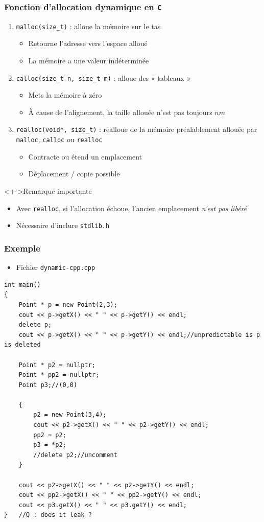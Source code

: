 \begin{frame}
\frametitle{Fonction d'allocation dynamique en \texttt{C}}
\begin{enumerate}[<+->]
\item \texttt{malloc(size\_t)} : alloue la mémoire sur le tas
	\begin{itemize}
	\item Retourne l'adresse vers l'espace alloué
	\item La mémoire a une valeur indéterminée
	\end{itemize}
\item \texttt{calloc(size\_t n, size\_t m)} : alloue des « tableaux »
	\begin{itemize}
	\item Mets la mémoire à zéro
	\item À cause de l'alignement, la taille allouée n'est pas toujours $nm$
	\end{itemize}	
\item \texttt{realloc(void*, size\_t)} : réalloue de la mémoire préalablement allouée par \texttt{malloc}, \texttt{calloc} ou \texttt{realloc}
	\begin{itemize}
	\item Contracte ou étend un emplacement
	\item Déplacement / copie possible
	\end{itemize}
\end{enumerate}
\begin{alertblock}<+->{Remarque importante}
	\begin{itemize}[<+->]
	\item Avec \texttt{realloc}, si l'allocation échoue, l'ancien emplacement \emph{n'est pas libéré}
	\end{itemize}
\end{alertblock}
\begin{itemize}[<+->]
\item Nécessaire d'inclure \texttt{stdlib.h}
\end{itemize}
\end{frame}

\begin{frame}[containsverbatim]
\frametitle{Exemple \cpp}
\begin{itemize}
\item Fichier \texttt{dynamic-cpp.cpp}
\end{itemize}
\begin{lstlisting}
int main()
{
	Point * p = new Point(2,3);
	cout << p->getX() << " " << p->getY() << endl;
	delete p;
	cout << p->getX() << " " << p->getY() << endl;//unpredictable is p is deleted
	
	Point * p2 = nullptr;
	Point * pp2 = nullptr;
	Point p3;//(0,0)

	{
		p2 = new Point(3,4);
		cout << p2->getX() << " " << p2->getY() << endl;
		pp2 = p2;
		p3 = *p2;		
		//delete p2;//uncomment
	}

	cout << p2->getX() << " " << p2->getY() << endl;
	cout << pp2->getX() << " " << pp2->getY() << endl;		
	cout << p3.getX() << " " << p3.getY() << endl;		
} 	//Q : does it leak ?
\end{lstlisting}
\end{frame}

